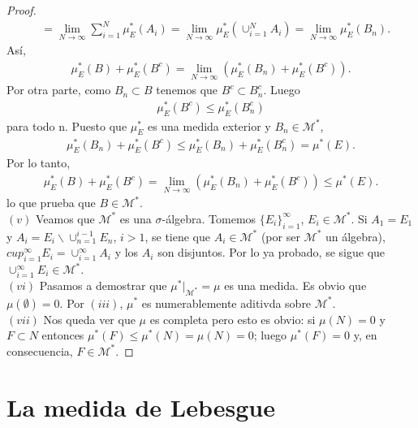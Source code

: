 \begin{proof}
\begin{align*}
    &= \lim_{N \to \infty}{ \sum_{i=1}^{N}{\mu_E^*(A_i)}} = \lim_{N \to \infty}{\mu_E^*(\cup_{i=1}^{N}{A_i})} = \lim_{N \to \infty}{\mu_E^*(B_n)}.
\end{align*}
Así,
\begin{align*}
    \mu_E^*(B) + \mu_E^*(B^c) = \lim_{N \to \infty}{(\mu_E^*(B_n) + \mu_E^*(B^c))}.
\end{align*}
Por otra parte, como $B_n \subset B$ tenemos que $B^c \subset B_n^c$. Luego
\begin{align*}
    \mu_E^*(B^c) \leq \mu_E^*(B_n^c)
\end{align*}
para todo n. Puesto que $\mu_E^*$ es una medida exterior y $B_n \in \mathcal{M}^*$,
\begin{align*}
    \mu_E^*(B_n) + \mu_E^*(B^c) \leq \mu_E^*(B_n) + \mu_E^*(B_n^c) = \mu^*(E).
\end{align*}
Por lo tanto,
\begin{align*}
    \mu_E^*(B) + \mu_E^*(B^c)  = \lim_{N \to \infty}{(\mu_E^*(B_n) + \mu_E^*(B^c))} \leq \mu^*(E).
\end{align*}
lo que prueba que $B \in \mathcal{M}^*$.
\\
\newline
$(v)$ Veamos que $\mathcal{M}^*$ es una $\sigma$-álgebra. Tomemos $\{E_i\}_{i=1}^{\infty}$, $E_i \in \mathcal{M}^*$. Si $A_1 = E_1$ y $A_i = E_i \backslash \cup_{n=1}^{i-1}{E_n}$, $i > 1$, se tiene que $A_i \in \mathcal{M}^*$ (por ser $\mathcal{M}^*$ un álgebra), $cup_{i=1}^{\infty}{E_i} = \cup_{i=1}^{\infty}{A_i}$ y los $A_i$ son disjuntos. Por lo ya probado, se sigue que $\cup_{i=1}^{\infty}{E_i} \in \mathcal{M}^*$.
\\
\newline
$(vi)$ Pasamos a demostrar que $\mu^*|_{\mathcal{M}^*} = \mu$ es una medida. Es obvio que $\mu(\emptyset) = 0$. Por $(iii)$, $\mu^*$ es numerablemente aditivda sobre $\mathcal{M}^*$.
\\
\newline
$(vii)$ Nos queda ver que $\mu$ es completa pero esto es obvio: si $\mu(N) = 0$ y $F \subset N$ entonces $\mu^*(F) \leq \mu^*(N) = \mu(N) = 0$; luego $\mu^*(F) = 0$ y, en consecuencia, $F \in \mathcal{M}^*$.
\end{proof}

\section{La medida de Lebesgue}

